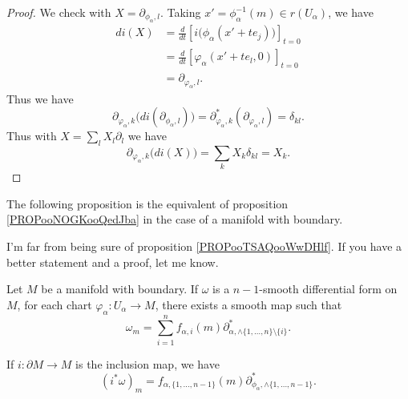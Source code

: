 \begin{proof}
	We check with \( X=\partial_{\phi_{\alpha}, l}\). Taking \( x'=\phi_{\alpha}^{-1}(m)\in r(U_{\alpha})\), we have
	\begin{subequations}
		\begin{align}
			di(X) & =\frac{d}{dt} \left[ i\big( \phi_{\alpha}(x'+te_j) \big)  \right]_{t=0} \\
			      & =\frac{d}{dt} \left[ \varphi_{\alpha}(x'+te_l,0)  \right]_{t=0}         \\
			      & =\partial_{\varphi_{\alpha},l}.
		\end{align}
	\end{subequations}
	Thus we have
	\begin{equation}
		\partial_{\varphi_{\alpha},k}\big( di(\partial_{\phi_{\alpha},l}) \big)=\partial_{\varphi_{\alpha},k}^*(\partial_{\varphi_{\alpha},l})=\delta_{kl}.
	\end{equation}
	Thus with \( X=\sum_{l}X_l\partial_l\) we have
	\begin{equation}
		\partial_{\varphi_{\alpha}, k}\big( di(X) \big)=\sum_kX_k\delta_{kl}=X_k.
	\end{equation}
\end{proof}


The following proposition is the equivalent of proposition \ref{PROPooNOGKooQedJba} in the case of a manifold with boundary.

\begin{probleme}
	I'm far from being sure of proposition \ref{PROPooTSAQooWwDHlf}. If you have a better statement and a proof, let me know.
\end{probleme}


\begin{proposition}	\label{PROPooTSAQooWwDHlf}
	Let \( M\) be a manifold with boundary. If \( \omega\) is a \( n-1\)-smooth differential form on \( M\), for each chart \(\varphi_{\alpha} \colon U_{\alpha}\to M  \), there exists a smooth map such that
	\begin{equation}
		\omega_m=\sum_{i=1}^nf_{\alpha,i}(m)\partial^{*}_{\alpha, \wedge\{ 1,\ldots,n \}\setminus\{ i \}}.
	\end{equation}

	If \(i \colon \partial M\to  M  \) is the inclusion map, we have
	\begin{equation}		\label{EQooGFNFooDMSVcI}
		(i^*\omega)_m=f_{\alpha,\{ 1,\ldots,n-1 \}}(m)\partial^*_{\phi_{\alpha},\wedge \{ 1,\ldots,n-1 \}}.
	\end{equation}
\end{proposition}

